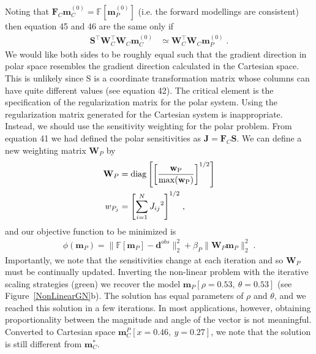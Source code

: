 \documentclass[paper]{geophysics}
\begin{document}
Noting that $\mathbf{F}_C \mathbf{m}_C^{(0)} = \mathbb{F}[ \mathbf{m}_P^{(0)}]$ (i.e. the forward modellings are consistent) then equation 45 and 46 are the same only if
\begin{equation}\label{gradientmCvsmPSimple}
\begin{split}
 \mathbf{S}^\top \mathbf{W}_C^\top\mathbf{W}_C \mathbf{m}_C^{(0)} & \simeq  \mathbf{W}_C^\top\mathbf{W}_C \mathbf{m}_P^{(0)}\;.
\end{split}
\end{equation}
We would like both sides to be roughly equal such that the gradient direction in polar space resembles the gradient direction calculated in the Cartesian space. This is unlikely since S is a coordinate transformation matrix whose columns can have quite different values (see equation 42).
The critical element is the specification of the regularization matrix for the polar system. Using the regularization matrix generated for the Cartesian system is inappropriate. Instead, we should use the sensitivity weighting for the polar problem. From equation 41 we had defined the polar sensitivities as $\mathbf{J}=\mathbf{F}_C\mathbf{S}$. We can define a new weighting matrix $\mathbf{W}_P$ by
\begin{equation}
\begin{split}
\mathbf{W}_P &= \rm{diag} \left[ {\left[\frac{\mathbf{ w}_P}{\rm{max}(\mathbf{w}_P)}\right]}^{1/2}\right]\\
w_{P_j} &= {\left[\sum_{i=1}^{N}{J_{ij}}^2 \right]}^{1/2}\;,
\end{split}
\end{equation}
 and our objective function to be minimized is
\begin{equation}\label{toyPolarSensW}
\begin{split}
\phi(\mathbf{m}_P) = \| \mathbb{F}[\mathbf{m}_P] - \mathbf{d}^{obs} \|_2^2 + \beta_P \| \mathbf{W}_P \mathbf{m}_P \|_2^2 \;.
\end{split}
\end{equation}
Importantly, we note that the sensitivities change at each iteration and so $\mathbf{W}_P$ must be continually updated.
Inverting the non-linear problem with the iterative scaling strategies (green) we recover the model $\mathbf{m}_P[\rho=0.53,\: \theta=0.53]$ (see Figure~\ref{NonLinearGN}b). The solution has equal parameters of $\rho$ and $\theta$, and we reached this solution in a few iterations. In most applications, however, obtaining proportionality between the magnitude and angle of the vector is not meaningful. Converted to Cartesian space $\mathbf{m}_C^P[x=0.46,\: y=0.27]$, we note that the solution is still different from $\mathbf{m}_C^*$.
\end{document}
